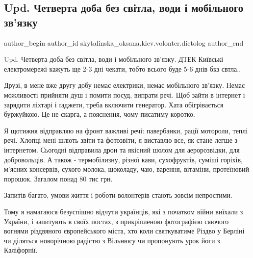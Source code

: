  
 
 
 
 
 
\subsection{Upd. Четверта доба без світла, води і мобільного зв'язку}
\label{sec:20_12_2022.fb.skytalinska_oksana.kiev.volonter.dietolog.1.doba}
 
\ifcmt
 author_begin
   author_id skytalinska_oksana.kiev.volonter.dietolog
 author_end
\fi

Upd. Четверта доба без світла, води і мобільного зв'язку. ДТЕК Київські
електромережі кажуть ще 2-3 дні чекати, тобто всього буде 5-6 днів бкз свтла..

Друзі, в мене вже другу добу немає електрики, немає мобільного зв'язку. Немає
можливості прийняти душ і помити посуд, випрати речі. Щоб зайти в інтернет і
зарядити ліхтарі і ґаджети, треба включити генератор. Хата обігрівається
буржуйкою. Це не скарга, а пояснення, чому писатиму коротко.

Я щотижня відправляю на фронт важливі речі: павербанки, рації мотороли, теплі
речі. Хлопці мені шлють звіти та фотозвіти, я виставлю все, як стане легше з
інтернетом. Сьогодні відправила дрон та якісний шолом для аеророзвідки, для
добровольців. А також - термобілизну, різної кави, сухофруктів, суміші
горіхів, м'ясних консервів, сухого молока, шоколаду, чаю, варення, вітаміни,
протеїновий порошок. Загалом понад 80 тис грн.

Запитів багато, умови життя і роботи волонтерів стають зовсім непростими. 

Тому я намагаюся  безуспішно відчути українців, які з початком війни виїхали з
України, і запитують в своїх постах, з прикріпленою фотографією сяючого вогнями
різдвяного європейського міста, хто коли святкуватиме Різдво у Берліні чи
діляться новорічною радістю з Вільнюсу чи пропонують урок йоги з Каліфорнії. 

